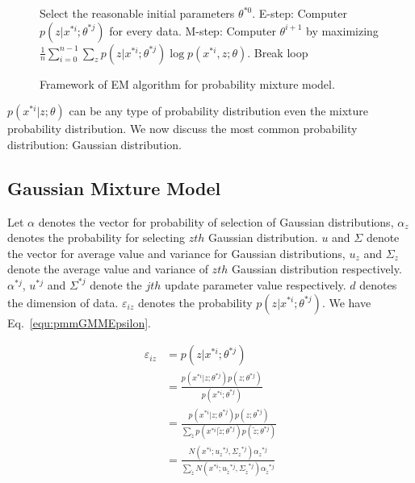 \documentclass[runningheads,openany]{xhlPaper}
\begin{document}
\begin{figure}
\caption{Framework of EM algorithm for probability mixture model.}
\label{fig:pmmAlgorithm}
\begin{algorithmic}
\STATE Select the reasonable initial parameters $\theta ^{*0}$.
\LOOP 
\STATE E-step: Computer $p\left( {{z}|{x^{*i}};\theta ^{*j} } \right)$ for every data.
\STATE M-step: Computer $\theta ^{i + 1}$ by maximizing $\frac{1}{n}\sum\limits_{i = 0}^{n - 1} {\sum\limits_z {p\left( {z|{x^{*i}}} ; \theta^{*j}\right)\log p\left( {{x^{*i}},z}; \theta \right)} } $.
\STATE Break loop
\ENDIF
\ENDLOOP
\end{algorithmic}
\end{figure}

$p\left( {{x^{*i}}|z;\theta } \right)$ can be any type of probability distribution even the mixture probability distribution. We now discuss the most common probability distribution: Gaussian distribution.

\subsection{Gaussian Mixture Model}
Let $\alpha$ denotes the vector for probability of selection of Gaussian distributions, $\alpha_{z}$ denotes the probability for selecting $zth$ Gaussian distribution. $u$ and $\Sigma$ denote the vector for average value and variance for Gaussian distributions, $u_{z}$ and $\Sigma_{z}$ denote the average value and variance of $zth$ Gaussian distribution respectively. $\alpha^{*j}$, $u^{*j}$ and $\Sigma^{*j}$ denote the $jth$ update parameter value respectively. $d$ denotes the dimension of data. $\varepsilon_{iz}$ denotes the probability $p\left( {z|{x^{*i}};{\theta ^{*j}}} \right)$. We have Eq.~\ref{equ:pmmGMMEpsilon}.

\begin{equation}
\label{equ:pmmGMMEpsilon}
\begin{aligned}
{\varepsilon _{iz}} &= p\left( {z|{x^{*i}};{\theta ^{*j}}} \right)\\
 &= \frac{{p\left( {{x^{*i}}|z;{\theta ^{*j}}} \right)p\left( {z;{\theta ^{*j}}} \right)}}{{p\left( {{x^{*i}};{\theta ^{*j}}} \right)}}\\
 &= \frac{{p\left( {{x^{*i}}|z;{\theta ^{*j}}} \right)p\left( {z;{\theta ^{*j}}} \right)}}{{\sum\limits_{\tilde{z}} {p\left( {{x^{*i}}|\tilde{z};{\theta ^{*j}}} \right)p\left( {\tilde{z};{\theta ^{*j}}} \right)} }}\\
 &= \frac{{N\left( {{x^{*i}};{u_z}^{*j},{\Sigma _z}^{*j}} \right){\alpha _z}^{*j}}}{{\sum\limits_{\tilde{z}} {N\left( {{x^{*i}};{u_{\tilde{z}}}^{*j},{\Sigma _{\tilde{z}}}^{*j}} \right){\alpha _{\tilde{z}}}^{*j}} }}
\end{aligned}
\end{equation}
\end{document}
